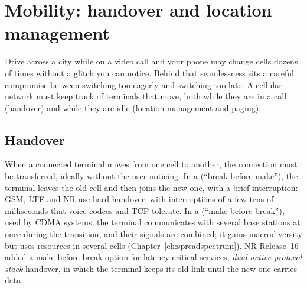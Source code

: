 \section{Mobility: handover and location management}
\label{sec:ch20:mobility}

Drive across a city while on a video call and your phone may change cells dozens of times without a glitch you
can notice. Behind that seamlessness sits a careful compromise between switching too eagerly and switching too
late. A cellular network must keep track of terminals that move, both while they are in a call (handover) and
while they are idle (location management and paging).


\subsection{Handover}

When a connected terminal moves from one cell to another, the connection must be transferred, ideally without the
user noticing. In a  (``break before make''), the terminal leaves the old cell and then joins the
new one, with a brief interruption: GSM, LTE and NR use hard handover, with interruptions of a few tens of
milliseconds that voice codecs and TCP tolerate. In a  (``make before break''), used by CDMA
systems, the terminal communicates with several base stations at once during the transition, and their signals
are combined; it gains macrodiversity but uses resources in several cells (Chapter~\ref{ch:spreadspectrum}). NR
Release~16 added a make-before-break option for latency-critical services, \emph{dual active protocol stack}
handover, in which the terminal keeps its old link until the new one carries data.


